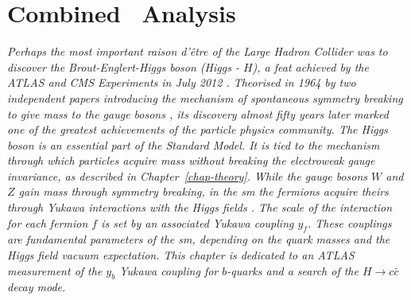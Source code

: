 \chapter[\color{oxfordblue} Combined \boldvhbc\ Analysis]{\color{oxfordblue} Combined \vhbc\ Analysis}\label{chap-VH}
\ChapFrame

\textit{Perhaps the most important \textit{raison d'être} of the \textit{Large Hadron Collider} was to discover the Brout-Englert-Higgs boson (Higgs - $H$), a feat achieved by the ATLAS and CMS Experiments in July 2012 \cite{ATLAS:2012yve, CMS:2012qbp}. Theorised in 1964 by two independent papers introducing the mechanism of spontaneous symmetry breaking to give mass to the gauge bosons \cite{Englert:1964et,  PhysRevLett.13.508}, its discovery almost fifty years later marked one of the greatest achievements of the particle physics community. The Higgs boson is an essential part of the Standard Model. It is tied to the mechanism through which particles acquire mass without breaking the electroweak gauge invariance, as described in Chapter~\ref{chap-theory}. While the gauge bosons $W$ and $Z$ gain mass through symmetry breaking, in the \gls{sm} the fermions acquire theirs through Yukawa interactions with the Higgs fields \cite{10.1143/PTPS.1.1}. The scale of the interaction for each fermion $f$ is set by an associated Yukawa coupling $y_f$. These couplings are fundamental parameters of the \gls{sm}, depending on the quark masses and the Higgs field vacuum expectation. This chapter is dedicated to an ATLAS measurement of the $y_b$ Yukawa coupling for $b$-quarks and a search of the $H \rightarrow c\bar{c}$ decay mode.}

